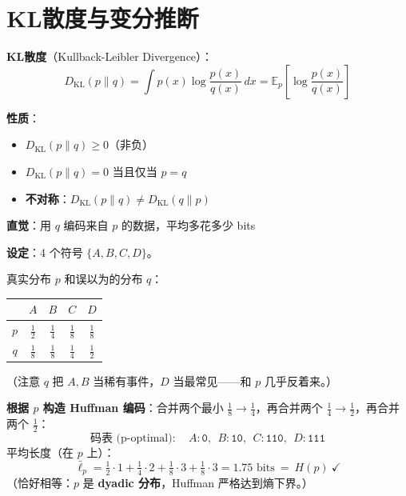 \documentclass[12pt, a4paper]{ctexart}
\begin{document}
\section{KL散度与变分推断}

\begin{blackboard}[KL散度的定义]

\textbf{KL散度}（Kullback-Leibler Divergence）：
\[
D_{\text{KL}}(p \| q) = \int p(x) \log \frac{p(x)}{q(x)} \, dx = \mathbb{E}_{p}\left[ \log \frac{p(x)}{q(x)} \right]
\]

\textbf{性质}：
\begin{itemize}
    \item $D_{\text{KL}}(p \| q) \geq 0$（非负）
    \item $D_{\text{KL}}(p \| q) = 0$ 当且仅当 $p = q$
    \item \textbf{不对称}：$D_{\text{KL}}(p \| q) \neq D_{\text{KL}}(q \| p)$
\end{itemize}

\textbf{直觉}：用 $q$ 编码来自 $p$ 的数据，平均多花多少 bits

\end{blackboard}

\begin{blackboard}

\textbf{设定}：4 个符号 $\{A, B, C, D\}$。

真实分布 $p$ 和误以为的分布 $q$：
\begin{center}
\begin{tabular}{c|cccc}
\toprule
 & $A$ & $B$ & $C$ & $D$ \\
\midrule
$p$ & $\tfrac{1}{2}$ & $\tfrac{1}{4}$ & $\tfrac{1}{8}$ & $\tfrac{1}{8}$ \\
$q$ & $\tfrac{1}{8}$ & $\tfrac{1}{8}$ & $\tfrac{1}{4}$ & $\tfrac{1}{2}$ \\
\bottomrule
\end{tabular}
\end{center}
（注意 $q$ 把 $A, B$ 当稀有事件，$D$ 当最常见——和 $p$ 几乎反着来。）

\textbf{根据 $p$ 构造 Huffman 编码}：合并两个最小 $\tfrac{1}{8}\to\tfrac{1}{4}$，再合并两个 $\tfrac{1}{4}\to\tfrac{1}{2}$，再合并两个 $\tfrac{1}{2}$：
\[
\text{码表 (p-optimal)}:\quad A: \mathtt{0},\ \ B: \mathtt{10},\ \ C: \mathtt{110},\ \ D: \mathtt{111}
\]
平均长度（在 $p$ 上）：
\[
\bar\ell_p = \tfrac{1}{2}\!\cdot\!1 + \tfrac{1}{4}\!\cdot\!2 + \tfrac{1}{8}\!\cdot\!3 + \tfrac{1}{8}\!\cdot\!3 = 1.75 \text{ bits}\ =\ H(p)\ \checkmark
\]
（恰好相等：$p$ 是 \textbf{dyadic 分布}，Huffman 严格达到熵下界。）

\end{blackboard}
\end{document}

